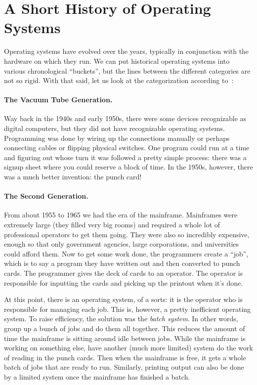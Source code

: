 \section*{A Short History of Operating Systems}
Operating systems have evolved over the years, typically in conjunction with the hardware on which they run. We can put historical operating systems into various chronological ``buckets'', but the lines between the different categories are not so rigid. With that said, let us look at the categorization according to~\cite{mos}:

\paragraph{The Vacuum Tube Generation.} Way back in the 1940s and early 1950s, there were some devices recognizable as digital computers, but they did not have recognizable operating systems. Programming was done by wiring up the connections manually or perhaps connecting cables or flipping physical switches. One program could run at a time and figuring out whose turn it was followed a pretty simple process: there was a signup sheet where you could reserve a block of time. In the 1950s, however, there was a much better invention: the punch card!

\paragraph{The Second Generation.} From about 1955 to 1965 we had the era of the mainframe. Mainframes were extremely large (they filled very big rooms) and required a whole lot of professional operators to get them going. They were also so incredibly expensive, enough so that only government agencies, large corporations, and universities could afford them. Now to get some work done, the programmers create a ``job'', which is to say a program they have written out and then converted to punch cards. The programmer gives the deck of cards to an operator. The operator is responsible for inputting the cards and picking up the printout when it's done. 

At this point, there is an operating system, of a sorts: it is the operator who is responsible for managing each job. This is, however, a pretty inefficient operating system. To raise efficiency, the solution was the \textit{batch system}. In other words, group up a bunch of jobs and do them all together. This reduces the amount of time the mainframe is sitting around idle between jobs. While the mainframe is working on something else, have another (much more limited) system do the work of reading in the punch cards. Then when the mainframe is free, it gets a whole batch of jobs that are ready to run. Similarly, printing output can also be done by a limited system once the mainframe has finished a batch. 



